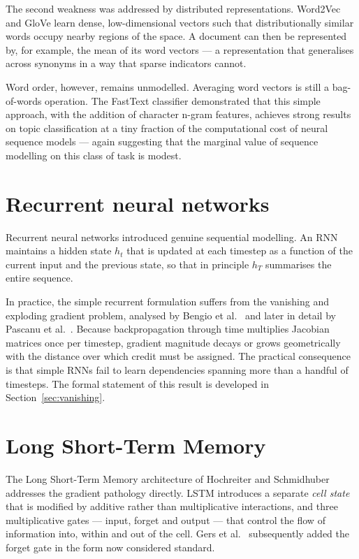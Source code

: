 The second weakness was addressed by distributed representations. Word2Vec \cite{mikolov2013}
and GloVe \cite{pennington2014} learn dense, low-dimensional vectors such that distributionally
similar words occupy nearby regions of the space. A document can then be represented by, for
example, the mean of its word vectors --- a representation that generalises across synonyms in a
way that sparse indicators cannot.

Word order, however, remains unmodelled. Averaging word vectors is still a bag-of-words
operation. The FastText classifier \cite{joulin2017} demonstrated that this simple approach,
with the addition of character n-gram features, achieves strong results on topic classification at
a tiny fraction of the computational cost of neural sequence models --- again suggesting that the
marginal value of sequence modelling on this class of task is modest.

\section{Recurrent neural networks}

Recurrent neural networks introduced genuine sequential modelling. An RNN maintains a hidden state
$h_t$ that is updated at each timestep as a function of the current input and the previous state,
so that in principle $h_T$ summarises the entire sequence.

In practice, the simple recurrent formulation suffers from the vanishing and exploding gradient
problem, analysed by Bengio et al.\ \cite{bengio1994} and later in detail by Pascanu et al.\
\cite{pascanu2013}. Because backpropagation through time multiplies Jacobian matrices once per
timestep, gradient magnitude decays or grows geometrically with the distance over which credit
must be assigned. The practical consequence is that simple RNNs fail to learn dependencies
spanning more than a handful of timesteps. The formal statement of this result is developed in
Section~\ref{sec:vanishing}.

\section{Long Short-Term Memory}

The Long Short-Term Memory architecture of Hochreiter and Schmidhuber \cite{hochreiter1997}
addresses the gradient pathology directly. LSTM introduces a separate \emph{cell state} that is
modified by additive rather than multiplicative interactions, and three multiplicative gates ---
input, forget and output --- that control the flow of information into, within and out of the
cell. Gers et al.\ \cite{gers2000} subsequently added the forget gate in the form now considered
standard.

